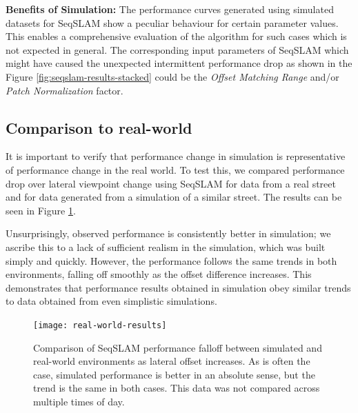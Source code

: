 \documentclass[letterpaper, 10 pt, conference]{ieeeconf}  %
\begin{document}
\textbf{Benefits of Simulation:} The performance curves generated using simulated datasets for SeqSLAM show a peculiar behaviour for certain parameter values. This enables a comprehensive evaluation of the algorithm for such cases which is not expected in general. The corresponding input parameters of SeqSLAM which might have caused the unexpected intermittent performance drop as shown in the Figure \ref{fig:seqslam-results-stacked} could be the \emph{Offset Matching Range} and/or \emph{Patch Normalization} factor.

\subsection{Comparison to real-world}

It is important to verify that performance change in simulation is representative of performance change in the real world. To test this, we compared performance drop over lateral viewpoint change using SeqSLAM for data from a real street and for data generated from a simulation of a similar street. The results can be seen in Figure \ref{fig:real-world-results}.

Unsurprisingly, observed performance is consistently better in simulation; we ascribe this to a lack of sufficient realism in the simulation, which was built simply and quickly. However, the performance follows the same trends in both environments, falling off smoothly as the offset difference increases. This demonstrates that performance results obtained in simulation obey similar trends to data obtained from even simplistic simulations.

\begin{figure}[t]
    \texttt{[image: real-world-results]}
    \caption{Comparison of SeqSLAM performance falloff between simulated and real-world environments as lateral offset increases. As is often the case, simulated performance is better in an absolute sense, but the trend is the same in both cases. This data was not compared across multiple times of day.}
    \label{fig:real-world-results}
\end{figure}


\end{document}
